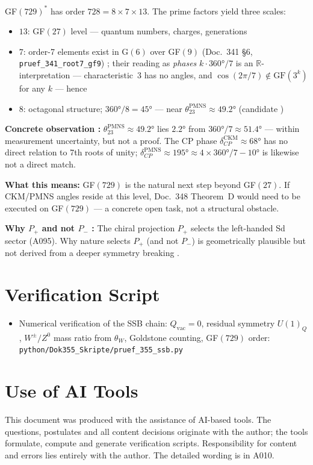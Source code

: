 GF$(729)^*$ has order $728 = 8\times7\times13$. The prime factors
yield three scales:
\begin{itemize}
  \item $13$: GF$(27)$ level --- quantum numbers, charges, generations \BM
  \item $7$: order-7 elements exist in G$(6)$ over GF$(9)$ (Doc.~341 §6,
    \texttt{pruef\_341\_root7\_gf9}) \BM; their reading as \emph{phases}
    $k\cdot360°/7$ is an $\mathbb{R}$-interpretation --- characteristic~3 has no
    angles, and $\cos(2\pi/7)\notin\mathrm{GF}(3^k)$ for any $k$ --- hence \SM
  \item $8$: octagonal structure; $360°/8 = 45°$ --- near
    $\theta_{23}^\text{PMNS}\approx49.2°$ (candidate \SM)
\end{itemize}

\textbf{Concrete observation \SM:}
$\theta_{23}^\text{PMNS}\approx49.2°$ lies $2.2°$ from $360°/7\approx51.4°$
--- within measurement uncertainty, but not a proof.
The CP phase $\delta_{CP}^\text{CKM}\approx68°$ has no direct relation to
7th roots of unity; $\delta_{CP}^\text{PMNS}\approx195°\approx4\times360°/7-10°$
is likewise not a direct match.

\textbf{What this means:} GF$(729)$ is the natural next step beyond GF$(27)$.
If CKM/PMNS angles reside at this level, Doc.~348 Theorem~D would need to be
executed on GF$(729)$ --- a concrete open task, not a structural obstacle.

\textbf{Why $P_+$ and not $P_-$ \SM:}
The chiral projection $P_+$ selects the left-handed Sd sector (A095).
Why nature selects $P_+$ (and not $P_-$) is geometrically plausible
but not derived from a deeper symmetry breaking \SM.

\section{Verification Script}

\begin{itemize}[leftmargin=2em,itemsep=2pt,topsep=2pt]
  \item Numerical verification of the SSB chain: $Q_\text{vac}=0$,
    residual symmetry $U(1)_Q$, $W^\pm/Z^0$ mass ratio from $\theta_W$,
    Goldstone counting, GF$(729)$ order:
    \texttt{python/Dok355\_Skripte/pruef\_355\_ssb.py}
\end{itemize}

\section{Use of AI Tools}

This document was produced with the assistance of AI-based tools.
The questions, postulates and all content decisions originate with the author;
the tools formulate, compute and generate verification scripts.
Responsibility for content and errors lies entirely with the author.
The detailed wording is in A010.
